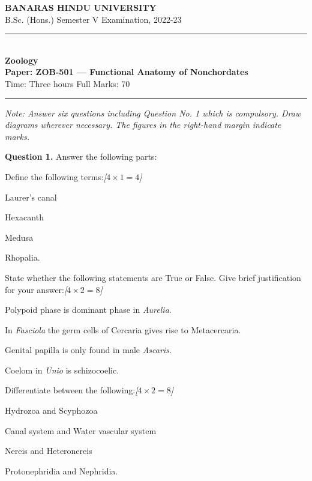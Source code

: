 \documentclass[11pt,a4paper]{article}
\newcommand{\pts}[1]{\hfill   \textit{[#1]}}
\begin{document}
\begin{center}
  {\large\bfseries BANARAS HINDU UNIVERSITY}\\[2pt]
  {\normalsize B.Sc. (Hons.) Semester V Examination, 2022-23}\\[6pt]
  \rule{0.8\linewidth}{0.5pt}\\[6pt]
  {\large\bfseries Zoology}\\[4pt]
  {\large\bfseries Paper: ZOB-501 --- Functional Anatomy of Nonchordates}\\[4pt]
  {\normalsize Time: Three hours \hfill Full Marks: 70}
\end{center}

\rule{\linewidth}{0.4pt}

\smallskip



\noindent   \textit{Note: Answer six questions including Question No. 1 which is compulsory. Draw diagrams wherever necessary. The figures in the right-hand margin indicate marks.}

\bigskip




\noindent   \textbf{Question 1.} Answer the following parts:

\begin{parts}
  \item Define the following terms:\pts{$4  \times 1 = 4$}
  
\begin{parts}
    \item Laurer's canal
    \item Hexacanth
    \item Medusa
    \item Rhopalia.
  \end{parts}
  
  \item State whether the following statements are True or False. Give brief justification for your answer:\pts{$4  \times 2 = 8$}
  
\begin{parts}
    \item Polypoid phase is dominant phase in   \textit{Aurelia}.
    \item In   \textit{Fasciola} the germ cells of Cercaria gives rise to Metacercaria.
    \item Genital papilla is only found in male   \textit{Ascaris}.
    \item Coelom in   \textit{Unio} is schizocoelic.
  \end{parts}

  \item Differentiate between the following:\pts{$4  \times 2 = 8$}
  
\begin{parts}
    \item Hydrozoa and Scyphozoa
    \item Canal system and Water vascular system
    \item Nereis and Heteronereis
    \item Protonephridia and Nephridia.
  \end{parts}
\end{parts}
\end{document}
